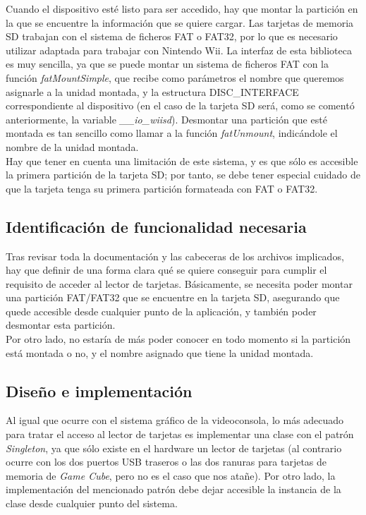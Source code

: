 Cuando el dispositivo esté listo para ser accedido, hay que montar la partición en la que se encuentre la información que se quiere cargar. Las tarjetas de memoria SD trabajan con el sistema de ficheros FAT o FAT32, por lo que es necesario utilizar  adaptada para trabajar con Nintendo Wii. La interfaz de esta biblioteca es muy sencilla, ya que se puede montar un sistema de ficheros FAT con la función \emph{fatMountSimple}, que recibe como parámetros el nombre que queremos asignarle a la unidad montada, y la estructura DISC\_INTERFACE correspondiente al dispositivo (en el caso de la tarjeta SD será, como se comentó anteriormente, la variable \emph{\_\_io\_wiisd}). Desmontar una partición que esté montada es tan sencillo como llamar a la función \emph{fatUnmount}, indicándole el nombre de la unidad montada.\\

Hay que tener en cuenta una limitación de este sistema, y es que sólo es accesible la primera partición de la tarjeta SD; por tanto, se debe tener especial cuidado de que la tarjeta tenga su primera partición formateada con FAT o FAT32.

\subsection{Identificación de funcionalidad necesaria}

Tras revisar toda la documentación y las cabeceras de los archivos implicados, hay que definir de una forma clara qué se quiere conseguir para cumplir el requisito de acceder al lector de tarjetas. Básicamente, se necesita poder montar una partición FAT/FAT32 que se encuentre en la tarjeta SD, asegurando que quede accesible desde cualquier punto de la aplicación, y también poder desmontar esta partición.\\

Por otro lado, no estaría de más poder conocer en todo momento si la partición está montada o no, y el nombre asignado que tiene la unidad montada.

\subsection{Diseño e implementación}

Al igual que ocurre con el sistema gráfico de la videoconsola, lo más adecuado para tratar el acceso al lector de tarjetas es implementar una clase con el patrón \emph{Singleton}, ya que sólo existe en el hardware un lector de tarjetas (al contrario ocurre con los dos puertos USB traseros o las dos ranuras para tarjetas de memoria de \emph{Game Cube}, pero no es el caso que nos atañe). Por otro lado, la implementación del mencionado patrón debe dejar accesible la instancia de la clase desde cualquier punto del sistema.\\

